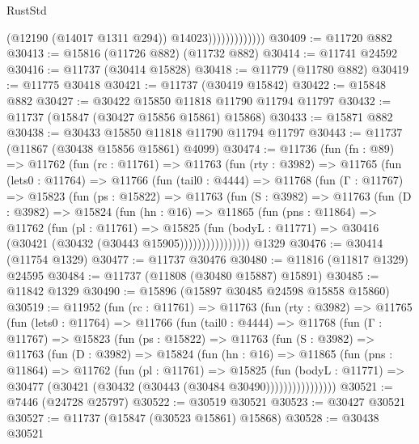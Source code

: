 \begin{lexlean}{RustStd}
\begin{coremodule}
                              (@12190 (@14017 @1311 @294))
                              @14023)))))))))))))
@30409 := @11720 @882
@30413 := @15816 (@11726 @882) (@11732 @882)
@30414 := @11741 @24592
@30416 := @11737 (@30414 @15828)
@30418 := @11779 (@11780 @882)
@30419 := @11775 @30418
@30421 := @11737 (@30419 @15842)
@30422 := @15848 @882
@30427 := @30422 @15850 @11818 @11790 @11794 @11797
@30432 := @11737 (@15847 (@30427 @15856 @15861) @15868)
@30433 := @15871 @882
@30438 := @30433 @15850 @11818 @11790 @11794 @11797
@30443 := @11737 (@11867 (@30438 @15856 @15861) @4099)
@30474 := @11736
    (fun (fn : @89) =>
    @11762
      (fun (rc : @11761) =>
      @11763
        (fun (rty : @3982) =>
        @11765
          (fun (lets0 : @11764) =>
          @11766
            (fun (tail0 : @4444) =>
            @11768
              (fun (Γ : @11767) =>
              @15823
                (fun (ps : @15822) =>
                @11763
                  (fun (S : @3982) =>
                  @11763
                    (fun (D : @3982) =>
                    @15824
                      (fun (hn : @16) =>
                      @11865
                        (fun (pns : @11864) =>
                        @11762
                          (fun (pl : @11761) =>
                          @15825
                            (fun (bodyL : @11771) =>
                            @30416 (@30421 (@30432 (@30443 @15905))))))))))))))))
    @1329
@30476 := @30414 (@11754 @1329)
@30477 := @11737 @30476
@30480 := @11816 (@11817 @1329) @24595
@30484 := @11737 (@11808 (@30480 @15887) @15891)
@30485 := @11842 @1329
@30490 := @15896 (@15897 @30485 @24598 @15858 @15860)
@30519 := @11952
    (fun (rc : @11761) =>
    @11763
      (fun (rty : @3982) =>
      @11765
        (fun (lets0 : @11764) =>
        @11766
          (fun (tail0 : @4444) =>
          @11768
            (fun (Γ : @11767) =>
            @15823
              (fun (ps : @15822) =>
              @11763
                (fun (S : @3982) =>
                @11763
                  (fun (D : @3982) =>
                  @15824
                    (fun (hn : @16) =>
                    @11865
                      (fun (pns : @11864) =>
                      @11762
                        (fun (pl : @11761) =>
                        @15825
                          (fun (bodyL : @11771) =>
                          @30477 (@30421 (@30432 (@30443 (@30484 @30490))))))))))))))))
@30521 := @7446 (@24728 @25797)
@30522 := @30519 @30521
@30523 := @30427 @30521
@30527 := @11737 (@15847 (@30523 @15861) @15868)
@30528 := @30438 @30521

\end{coremodule}
\end{lexlean}
